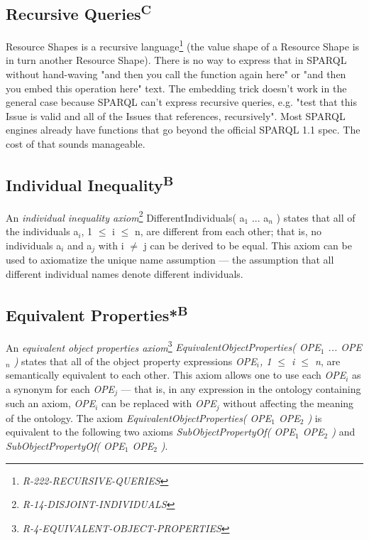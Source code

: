 \documentclass{llncs}
\begin{document}
\subsection{Recursive Queries\textsuperscript{C}}

Resource Shapes is a recursive language\footnote{\emph{R-222-RECURSIVE-QUERIES}} (the value shape of a Resource Shape is in turn another Resource Shape). 
There is no way to express that in SPARQL without hand-waving "and then you call the function again here" or "and then you embed this operation here" text.  
The embedding trick doesn't work
in the general case because SPARQL can't express recursive queries,
e.g. "test that this Issue is valid and all of the Issues that references, recursively".
Most SPARQL engines already have
functions that go beyond the official SPARQL 1.1 spec. 
The cost of that sounds manageable.

\subsection{Individual Inequality\textsuperscript{B}}

An \emph{individual inequality axiom}\footnote{\emph{R-14-DISJOINT-INDIVIDUALS}} DifferentIndividuals( a$_1$ ... a$_n$ ) states that all of the individuals a$_i$, 1 $\leq$ i $\leq$ n, are different from each other; 
that is, no individuals a$_i$ and a$_j$ with i $\neq$ j can be derived to be equal. 
This axiom can be used to axiomatize the unique name assumption — the assumption that all different individual names denote different individuals. 

\subsection{Equivalent Properties*\textsuperscript{B}}

An \emph{equivalent object properties axiom}\footnote{\emph{R-4-EQUIVALENT-OBJECT-PROPERTIES}} \emph{EquivalentObjectProperties( OPE$_1$ ... OPE$_n$ )} states that all of the object property expressions \emph{OPE$_i$, 1 $\leq$ i $\leq$ n}, are semantically equivalent to each other. This axiom allows one to use each \emph{OPE$_i$} as a synonym for each \emph{OPE$_j$} — that is, in any expression in the ontology containing such an axiom, \emph{OPE$_i$} can be replaced with \emph{OPE$_j$} without affecting the meaning of the ontology. The axiom \emph{EquivalentObjectProperties( OPE$_1$ OPE$_2$ )} is equivalent to the following two axioms \emph{SubObjectPropertyOf( OPE$_1$ OPE$_2$ )} and \emph{SubObjectPropertyOf( OPE$_1$ OPE$_2$ )}.
\end{document}
